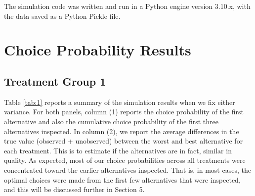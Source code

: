 \documentclass[12pt]{article}
\begin{document}
The simulation code was written and run in a Python engine version 3.10.x, with the data saved as a Python Pickle file.

\section{Choice Probability Results}
\subsection{Treatment Group 1}
Table \ref{tab:1} reports a summary of the simulation results when we fix either variance. For both panels, column (1) reports the choice probability of the first alternative and also the cumulative choice probability of the first three alternatives inspected. In column (2), we report the average differences in the true value (observed + unobserved) between the worst and best alternative for each treatment. This is to estimate if the alternatives are in fact, similar in quality. As expected, most of our choice probabilities across all treatments were concentrated toward the earlier alternatives inspected. That is, in most cases, the optimal choices were made from the first few alternatives that were inspected, and this will be discussed further in Section 5.
\end{document}
